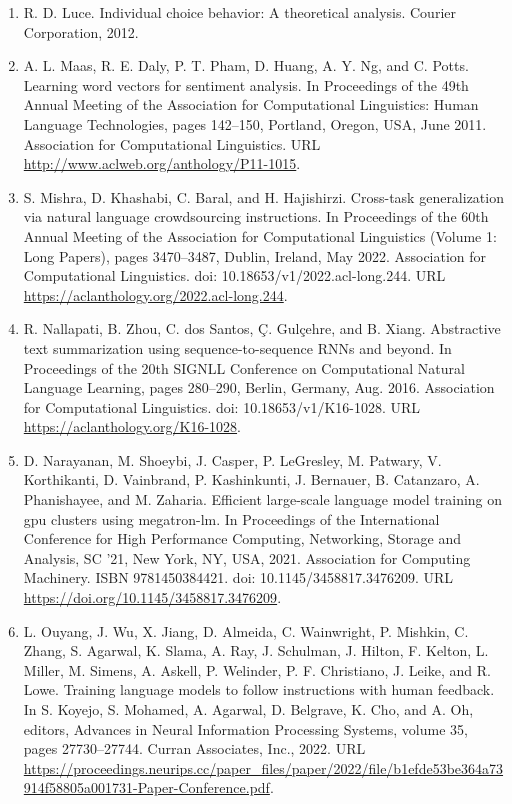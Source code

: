 \documentclass[11pt,UTF8,fontset=fandol]{ctexart}
\begin{document}
\begin{enumerate}[leftmargin=2.2em, itemsep=2pt]
\item R. D. Luce. Individual choice behavior: A theoretical analysis. Courier Corporation, 2012.
\item A. L. Maas, R. E. Daly, P. T. Pham, D. Huang, A. Y. Ng, and C. Potts. Learning word vectors for sentiment analysis. In Proceedings of the 49th Annual Meeting of the Association for Computational Linguistics: Human Language Technologies, pages 142--150, Portland, Oregon, USA, June 2011. Association for Computational Linguistics. URL \url{http://www.aclweb.org/anthology/P11-1015}.
\item S. Mishra, D. Khashabi, C. Baral, and H. Hajishirzi. Cross-task generalization via natural language crowdsourcing instructions. In Proceedings of the 60th Annual Meeting of the Association for Computational Linguistics (Volume 1: Long Papers), pages 3470--3487, Dublin, Ireland, May 2022. Association for Computational Linguistics. doi: 10.18653/v1/2022.acl-long.244. URL \url{https://aclanthology.org/2022.acl-long.244}.
\item R. Nallapati, B. Zhou, C. dos Santos, \c{C}. Gul\c{c}ehre, and B. Xiang. Abstractive text summarization using sequence-to-sequence RNNs and beyond. In Proceedings of the 20th SIGNLL Conference on Computational Natural Language Learning, pages 280--290, Berlin, Germany, Aug. 2016. Association for Computational Linguistics. doi: 10.18653/v1/K16-1028. URL \url{https://aclanthology.org/K16-1028}.
\item D. Narayanan, M. Shoeybi, J. Casper, P. LeGresley, M. Patwary, V. Korthikanti, D. Vainbrand, P. Kashinkunti, J. Bernauer, B. Catanzaro, A. Phanishayee, and M. Zaharia. Efficient large-scale language model training on gpu clusters using megatron-lm. In Proceedings of the International Conference for High Performance Computing, Networking, Storage and Analysis, SC '21, New York, NY, USA, 2021. Association for Computing Machinery. ISBN 9781450384421. doi: 10.1145/3458817.3476209. URL \url{https://doi.org/10.1145/3458817.3476209}.
\item L. Ouyang, J. Wu, X. Jiang, D. Almeida, C. Wainwright, P. Mishkin, C. Zhang, S. Agarwal, K. Slama, A. Ray, J. Schulman, J. Hilton, F. Kelton, L. Miller, M. Simens, A. Askell, P. Welinder, P. F. Christiano, J. Leike, and R. Lowe. Training language models to follow instructions with human feedback. In S. Koyejo, S. Mohamed, A. Agarwal, D. Belgrave, K. Cho, and A. Oh, editors, Advances in Neural Information Processing Systems, volume 35, pages 27730--27744. Curran Associates, Inc., 2022. URL \url{https://proceedings.neurips.cc/paper_files/paper/2022/file/b1efde53be364a73914f58805a001731-Paper-Conference.pdf}.

\end{enumerate}
\end{document}
